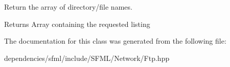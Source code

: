 Return the array of directory/file names. 

\begin{DoxyReturn}{Returns}
Array containing the requested listing 
\end{DoxyReturn}


The documentation for this class was generated from the following file\+:\begin{DoxyCompactItemize}
\item 
dependencies/sfml/include/\+S\+F\+M\+L/\+Network/Ftp.\+hpp\end{DoxyCompactItemize}
